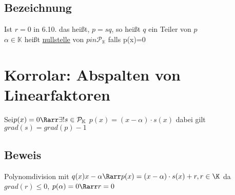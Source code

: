 \subsection*{Bezeichnung}
Ist $r = 0$ in 6.10. das heißt, $p = sq$, so heißt $q$ ein Teiler von $p$\\
$\alpha \in \mathbb{K}$ heißt \ul{nullstelle} von $p in \mathcal{P}_{\mathbb{K}}$ falls p(x)=0
\section{Korrolar: Abspalten von Linearfaktoren}
Sei$ p(x) = 0 \Rarr \exists! s \in \mathcal{P}_{\mathbb{K}}$ $p(x) = (x - \alpha) \cdot s(x)$ dabei gilt $grad(s) = grad(p) -1$
\subsection*{Beweis}
Polynomdivision mit $q(x)x-\alpha \Rarr p(x) = (x-\alpha)\cdot s(x) + r, r \in \K$ da $grad(r) ≤ 0$, $p(\alpha) = 0 \Rarr r = 0$